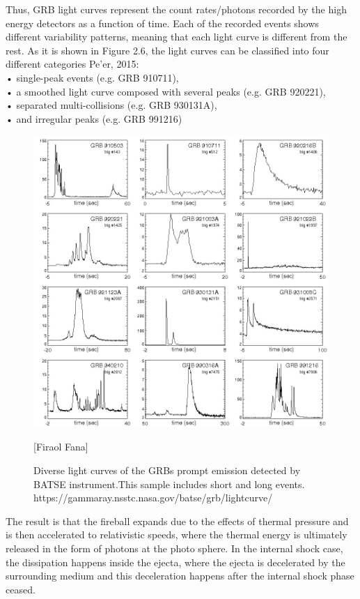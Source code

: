 Thus, GRB light curves represent the count rates/photons recorded by the
high energy detectors as a function of time. Each of the recorded events shows
different variability patterns, meaning that each light curve is different from the
rest. As it is shown in Figure 2.6, the light curves can be classified into four
different categories Pe’er, 2015:\\
• single-peak events (e.g. GRB 910711),\\
• a smoothed light curve composed with several peaks (e.g. GRB 920221),\\
• separated multi-collisions (e.g. GRB 930131A),\\
• and irregular peaks (e.g. GRB 991216)\\
\begin{figure}[h]
\begin{center}
\includegraphics[scale=0.4]{Figures/prompt.png}
\caption{Diverse light curves of the GRBs prompt emission detected by BATSE instrument.This sample includes short and long events. https://gammaray.nsstc.nasa.gov/batse/grb/lightcurve/}[Firaol Fana]
\end{center}
\end{figure}
The result is that the fireball expands due to the effects of thermal pressure and
is then accelerated to relativistic speeds, where the thermal energy is ultimately
released in the form of photons at the photo sphere. In the internal shock case,
the dissipation happens inside the ejecta, where the ejecta is decelerated by the
surrounding medium and this deceleration happens after the internal shock phase
ceased. \citep{6}\citep{10}\citep{23}
